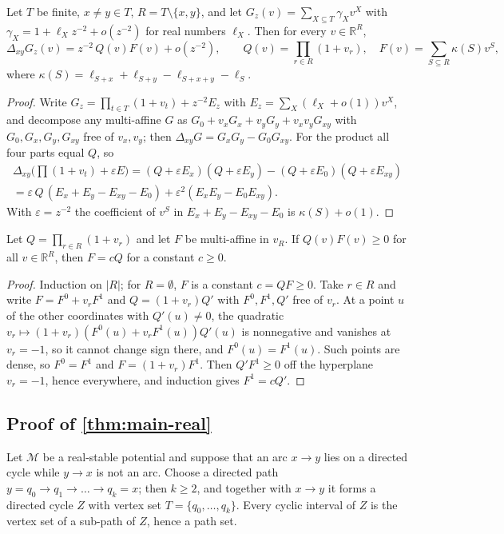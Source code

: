\documentclass[final]{siamart0516}
\numberwithin{theorem}{section}
\numberwithin{equation}{section}
\theoremstyle{siamnonum}
\theoremstyle{plain}
\newcommand{\RR}{\mathbb{R}}
\newcommand{\Mpot}{\mathcal{M}}           %
\begin{document}
\begin{lemma}\label{lem:first-order}
Let $T$ be finite, $x\ne y\in T$, $R=T\setminus\{x,y\}$, and let $G_z(v)=\sum_{X\subseteq T}\gamma_Xv^X$ with $\gamma_X=1+\ell_Xz^{-2}+o(z^{-2})$ for real numbers $\ell_X$. Then for every $v\in\RR^R$,
\[
\Delta_{xy}G_z(v)=z^{-2}\,Q(v)F(v)+o(z^{-2}),\qquad Q(v)=\prod_{r\in R}(1+v_r),\quad F(v)=\sum_{S\subseteq R}\kappa(S)v^S,
\]
where $\kappa(S)=\ell_{S+x}+\ell_{S+y}-\ell_{S+x+y}-\ell_S$.
\end{lemma}
\begin{proof}
Write $G_z=\prod_{t\in T}(1+v_t)+z^{-2}E_z$ with $E_z=\sum_X(\ell_X+o(1))v^X$, and decompose any multi-affine $G$ as $G_0+v_xG_x+v_yG_y+v_xv_yG_{xy}$ with $G_0,G_x,G_y,G_{xy}$ free of $v_x,v_y$; then $\Delta_{xy}G=G_xG_y-G_0G_{xy}$. For the product all four parts equal $Q$, so
\begin{multline*}
\Delta_{xy}\bigl(\textstyle\prod(1+v_t)+\varepsilon E\bigr)=(Q+\varepsilon E_x)(Q+\varepsilon E_y)-(Q+\varepsilon E_0)(Q+\varepsilon E_{xy})\\
=\varepsilon\,Q\,(E_x+E_y-E_{xy}-E_0)+\varepsilon^2(E_xE_y-E_0E_{xy}).
\end{multline*}
With $\varepsilon=z^{-2}$ the coefficient of $v^S$ in $E_x+E_y-E_{xy}-E_0$ is $\kappa(S)+o(1)$.
\end{proof}

\begin{lemma}[vanishing]\label{lem:vanishing}
Let $Q=\prod_{r\in R}(1+v_r)$ and let $F$ be multi-affine in $v_R$. If $Q(v)F(v)\ge0$ for all $v\in\RR^R$, then $F=cQ$ for a constant $c\ge0$.
\end{lemma}
\begin{proof}
Induction on $|R|$; for $R=\emptyset$, $F$ is a constant $c=QF\ge0$. Take $r\in R$ and write $F=F^0+v_rF^1$ and $Q=(1+v_r)Q'$ with $F^0,F^1,Q'$ free of $v_r$. At a point $u$ of the other coordinates with $Q'(u)\ne0$, the quadratic $v_r\mapsto(1+v_r)(F^0(u)+v_rF^1(u))Q'(u)$ is nonnegative and vanishes at $v_r=-1$, so it cannot change sign there, and $F^0(u)=F^1(u)$. Such points are dense, so $F^0=F^1$ and $F=(1+v_r)F^1$. Then $Q'F^1\ge0$ off the hyperplane $v_r=-1$, hence everywhere, and induction gives $F^1=cQ'$.
\end{proof}

\subsection{Proof of \texorpdfstring{\cref{thm:main-real}}{Theorem 9.5}}
Let $\Mpot$ be a real-stable potential and suppose that an arc $x\to y$ lies on a directed cycle while $y\to x$ is not an arc. Choose a directed path $y=q_0\to q_1\to\dots\to q_k=x$; then $k\ge2$, and together with $x\to y$ it forms a directed cycle $Z$ with vertex set $T=\{q_0,\dots,q_k\}$. Every cyclic interval of $Z$ is the vertex set of a sub-path of $Z$, hence a path set.
\end{document}

